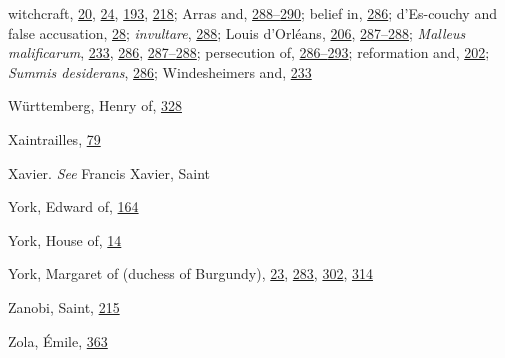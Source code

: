 witchcraft,
\protect\hyperlink{08_Chapter_One__THE_PASSIONATE_INTE.xhtmlux5cux23page_20}{20},
\protect\hyperlink{08_Chapter_One__THE_PASSIONATE_INTE.xhtmlux5cux23page_24}{24},
\protect\hyperlink{13_Chapter_Six__THE_DEPICTION_OF_TH.xhtmlux5cux23page_193}{193},
\protect\hyperlink{14_Chapter_Seven__THE_PIOUS_PERSONA.xhtmlux5cux23page_218}{218};
Arras and,
\protect\hyperlink{18_Chapter_Eleven__THE_FORMS_OF_THO.xhtmlux5cux23page_288}{288--}\protect\hyperlink{18_Chapter_Eleven__THE_FORMS_OF_THO.xhtmlux5cux23page_290}{290};
belief in,
\protect\hyperlink{18_Chapter_Eleven__THE_FORMS_OF_THO.xhtmlux5cux23page_286}{286};
d'Es-couchy and false accusation,
\protect\hyperlink{08_Chapter_One__THE_PASSIONATE_INTE.xhtmlux5cux23page_28}{28};
\emph{invultare},
\protect\hyperlink{18_Chapter_Eleven__THE_FORMS_OF_THO.xhtmlux5cux23page_288}{288};
Louis d'Orléans,
\protect\hyperlink{14_Chapter_Seven__THE_PIOUS_PERSONA.xhtmlux5cux23page_206}{206},
\protect\hyperlink{18_Chapter_Eleven__THE_FORMS_OF_THO.xhtmlux5cux23page_287}{287--}\protect\hyperlink{18_Chapter_Eleven__THE_FORMS_OF_THO.xhtmlux5cux23page_288}{288};
\emph{Malleus malificarum},
\protect\hyperlink{15_Chapter_Eight__RELIGIOUS_EXCITAT.xhtmlux5cux23page_233}{233},
\protect\hyperlink{18_Chapter_Eleven__THE_FORMS_OF_THO.xhtmlux5cux23page_286}{286},
\protect\hyperlink{18_Chapter_Eleven__THE_FORMS_OF_THO.xhtmlux5cux23page_287}{287--}\protect\hyperlink{18_Chapter_Eleven__THE_FORMS_OF_THO.xhtmlux5cux23page_288}{288};
persecution of,
\protect\hyperlink{18_Chapter_Eleven__THE_FORMS_OF_THO.xhtmlux5cux23page_286}{286--}\protect\hyperlink{18_Chapter_Eleven__THE_FORMS_OF_THO.xhtmlux5cux23page_293}{293};
reformation and,
\protect\hyperlink{13_Chapter_Six__THE_DEPICTION_OF_TH.xhtmlux5cux23page_202}{202};
\emph{Summis desiderans},
\protect\hyperlink{18_Chapter_Eleven__THE_FORMS_OF_THO.xhtmlux5cux23page_286}{286};
Windesheimers and,
\protect\hyperlink{15_Chapter_Eight__RELIGIOUS_EXCITAT.xhtmlux5cux23page_233}{233}

Württemberg, Henry of,
\protect\hyperlink{20_ILLUSTRATIONS_FOLLOW_PAGE.xhtmlux5cux23page_328}{328}

Xaintrailles,
\protect\hyperlink{10_Chapter_Three__THE_HEROIC_DREAM.xhtmlux5cux23page_79}{79}

Xavier. \emph{See} Francis Xavier, Saint

York, Edward of,
\protect\hyperlink{12_Chapter_Five__THE_VISION_OF_DEAT.xhtmlux5cux23page_164}{164}

York, House of,
\protect\hyperlink{08_Chapter_One__THE_PASSIONATE_INTE.xhtmlux5cux23page_14}{14}

York, Margaret of (duchess of Burgundy),
\protect\hyperlink{08_Chapter_One__THE_PASSIONATE_INTE.xhtmlux5cux23page_23}{23},
\protect\hyperlink{18_Chapter_Eleven__THE_FORMS_OF_THO.xhtmlux5cux23page_283}{283},
\protect\hyperlink{20_ILLUSTRATIONS_FOLLOW_PAGE.xhtmlux5cux23page_302}{302},
\protect\hyperlink{20_ILLUSTRATIONS_FOLLOW_PAGE.xhtmlux5cux23page_314}{314}

Zanobi, Saint,
\protect\hyperlink{14_Chapter_Seven__THE_PIOUS_PERSONA.xhtmlux5cux23page_215}{215}

Zola, Émile,
\protect\hyperlink{21_Chapter_Thirteen__IMAGE_AND_WORD.xhtmlux5cux23page_363}{363}